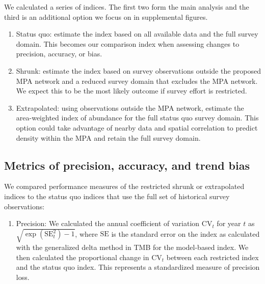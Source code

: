 \documentclass[12pt]{article}
\begin{document}
\begin{spacing}{1.4}

We calculated a series of indices. The first two form the main analysis and the third is an additional option we focus on in supplemental figures.

\begin{enumerate}

\item Status quo: estimate the index based on all available data and the full survey domain. This becomes our comparison index when assessing changes to precision, accuracy, or bias.

\item Shrunk: estimate the index based on survey observations outside the proposed MPA network and a reduced survey domain that excludes the MPA network. We expect this to be the most likely outcome if survey effort is restricted.

\item Extrapolated: using observations outside the MPA network, estimate the area-weighted index of abundance for the full status quo survey domain. This option could take advantage of nearby data and spatial correlation to predict density within the MPA and retain the full survey domain.
\end{enumerate}

\subsection*{Metrics of precision, accuracy, and trend bias}

We compared performance measures of the restricted shrunk or extrapolated indices to the status quo indices that use the full set of historical survey observations:

\begin{enumerate}
    \item Precision: We calculated the annual coefficient of variation $\mathrm{CV}_{t}$ for year $t$ as $\sqrt{\exp(\mathrm{SE}_{t}^2) - 1}$, where $\mathrm{SE}$ is the standard error on the index as calculated with the generalized delta method in TMB \citep{kristensen2016} for the model-based index. We then calculated the proportional change in $\mathrm{CV}_{t}$ between each restricted index and the status quo index. This represents a standardized measure of precision loss.


\end{enumerate}
\end{spacing}
\end{document}
